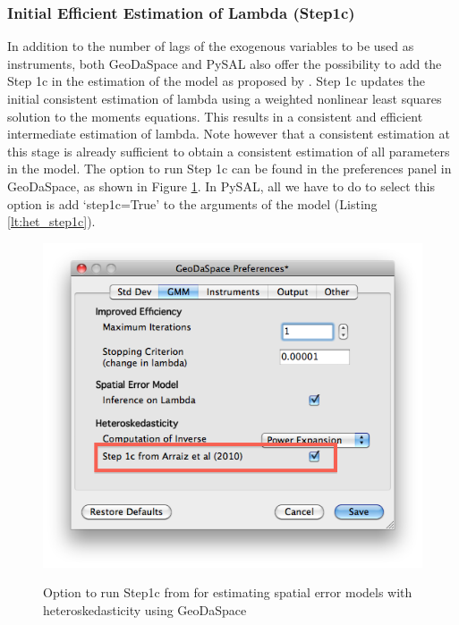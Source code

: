 \documentclass{article}
\begin{document}
\subsubsection{Initial Efficient Estimation of Lambda (Step1c)}
\label{s:step1c}
In addition to the number of lags of the exogenous variables to be used as instruments, both GeoDaSpace and PySAL also offer the possibility to add the Step 1c in the estimation of the model as proposed by \citet{Arraiz10}. Step 1c updates the initial consistent estimation of lambda using a weighted nonlinear least squares solution to the moments equations. This results in a consistent and efficient intermediate estimation of lambda. Note however that a consistent estimation at this stage is already sufficient to obtain a consistent estimation of all parameters in the model. The option to run Step 1c can be found in the preferences panel in GeoDaSpace, as shown in Figure \ref{f:GS_pref_step1c}. In PySAL, all we have to do to select this option is add `step1c=True' to the arguments of the model (Listing \ref{lt:het_step1c}).



\begin{figure}[htb]
\caption{Option to run Step1c from \citet{Arraiz10} for estimating spatial error models with heteroskedasticity using GeoDaSpace}
\label{f:GS_pref_step1c}
\begin{center}
\includegraphics[width=0.7\linewidth]{GS_pref_step1c.png}\\
\end{center}
\end{figure}
\end{document}
